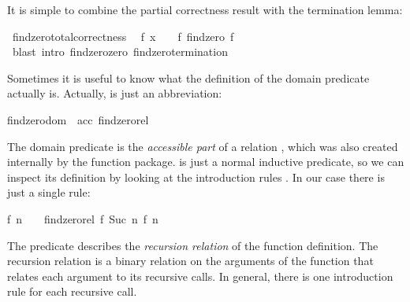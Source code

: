 \begin{isabellebody}
%
\isadelimproof
%
\endisadelimproof
%
\begin{isamarkuptext}%
\noindent It is simple to combine the partial correctness result with the
  termination lemma:%
\end{isamarkuptext}%
\isamarkuptrue%
\isamarkupfalse%
\ findzero{\isacharunderscore}total{\isacharunderscore}correctness{\isacharcolon}\isanewline
\ \ {\isachardoublequoteopen}f\ x\ {\isacharequal}\ {}\ {\isasymLongrightarrow}\ f\ {\isacharparenleft}findzero\ f\ {}{\isacharparenright}\ {\isacharequal}\ {}{\isachardoublequoteclose}\isanewline
%
\isadelimproof
%
\endisadelimproof
%
\isatagproof
{}\isamarkupfalse%
\ {\isacharparenleft}blast\ intro{\isacharcolon}\ findzero{\isacharunderscore}zero\ findzero{\isacharunderscore}termination{\isacharparenright}%
\endisatagproof
{\isafoldproof}%
%
\isadelimproof
%
\endisadelimproof
%
\isamarkuptrue%
%
\begin{isamarkuptext}%
Sometimes it is useful to know what the definition of the domain
  predicate actually is. Actually,  is just an
  abbreviation:

  \begin{isabelle}%
findzero{\isacharunderscore}dom\ {\isasymequiv}\ acc\ findzero{\isacharunderscore}rel%
\end{isabelle}

  The domain predicate is the \emph{accessible part} of a relation , which was also created internally by the function
  package.  is just a normal
  inductive predicate, so we can inspect its definition by
  looking at the introduction rules .
  In our case there is just a single rule:

  \begin{isabelle}%
{\isacharquery}f\ {\isacharquery}n\ {\isasymnoteq}\ {}\ {\isasymLongrightarrow}\ findzero{\isacharunderscore}rel\ {\isacharparenleft}{\isacharquery}f{\isacharcomma}\ Suc\ {\isacharquery}n{\isacharparenright}\ {\isacharparenleft}{\isacharquery}f{\isacharcomma}\ {\isacharquery}n{\isacharparenright}%
\end{isabelle}

  The predicate 
  describes the \emph{recursion relation} of the function
  definition. The recursion relation is a binary relation on
  the arguments of the function that relates each argument to its
  recursive calls. In general, there is one introduction rule for each
  recursive call.


\end{isamarkuptext}
\end{isabellebody}
